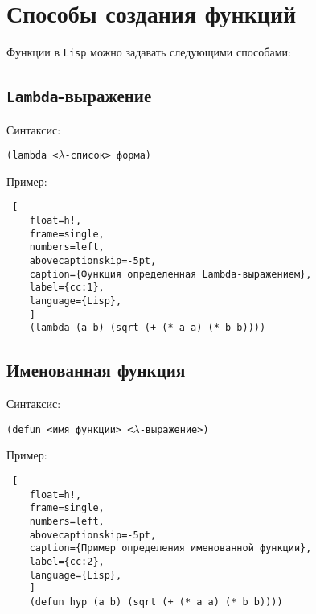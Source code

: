 \section{Способы создания функций}

Функции в \texttt{Lisp} можно задавать следующими способами:

\subsection*{\texttt{Lambda}-выражение}

Синтаксис:

\texttt{(lambda <$\lambda$-список> форма)}

Пример:

\begin{lstlisting} [
	float=h!,
	frame=single,
	numbers=left,
	abovecaptionskip=-5pt,
	caption={Функция определенная Lambda-выражением},
	label={cc:1},
	language={Lisp},
	]
	(lambda (a b) (sqrt (+ (* a a) (* b b))))
\end{lstlisting}

\subsection*{Именованная функция}

Синтаксис:

\texttt{(defun <имя функции> <$\lambda$-выражение>)}

Пример:

\begin{lstlisting} [
	float=h!,
	frame=single,
	numbers=left,
	abovecaptionskip=-5pt,
	caption={Пример определения именованной функции},
	label={cc:2},
	language={Lisp},
	]
	(defun hyp (a b) (sqrt (+ (* a a) (* b b))))
\end{lstlisting}

